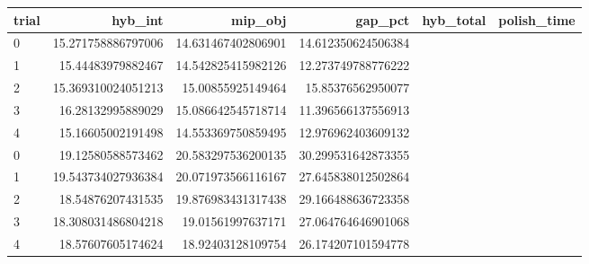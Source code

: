 \begin{tabular}{lrrrrr}
\hline
trial & hyb_int & mip_obj & gap_pct & hyb_total & polish_time \\ \hline
0 & 15.271758886797006 & 14.631467402806901 & 14.612350624506384 &  &  \\
1 & 15.44483979882467 & 14.542825415982126 & 12.273749788776222 &  &  \\
2 & 15.369310024051213 & 15.00855925149464 & 15.85376562950077 &  &  \\
3 & 16.28132995889029 & 15.086642545718714 & 11.396566137556913 &  &  \\
4 & 15.16605002191498 & 14.553369750859495 & 12.976962403609132 &  &  \\
0 & 19.12580588573462 & 20.583297536200135 & 30.299531642873355 &  &  \\
1 & 19.543734027936384 & 20.071973566116167 & 27.645838012502864 &  &  \\
2 & 18.54876207431535 & 19.876983431317438 & 29.166488636723358 &  &  \\
3 & 18.308031486804218 & 19.01561997637171 & 27.064764646901068 &  &  \\
4 & 18.57607605174624 & 18.92403128109754 & 26.174207101594778 &  &  \\
\hline
\end{tabular}
